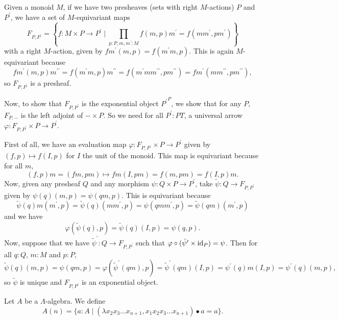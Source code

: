 \begin{definition}
  Given a monoid $ M $, if we have two presheaves (sets with right $ M $-actions) $ P $ and $ P^\prime $, we have a set of $ M $-equivariant maps
  \[ F_{P, P^\prime} = \left\{ f: M \times P \to P^\prime \mid \prod_{p : P, m, m^\prime: M} f(m, p)m^\prime = f(m m^\prime, p m^\prime) \right\} \]
  with a right $ M $-action, given by $ f m^\prime(m, p) = f(m^\prime m, p) $. This is again $ M $-equivariant because
  \[ fm^\prime(m, p)m^{\prime \prime} = f(m^\prime m, p)m^{\prime \prime} = f(m^\prime m m^{\prime \prime}, p m^{\prime \prime}) = f m^\prime(m m^{\prime \prime}, p m^{\prime \prime}), \]
  so $ F_{P, P^\prime} $ is a presheaf.

  Now, to show that $ F_{P, P^\prime} $ is the exponential object $ {P^\prime}^P $, we show that for any $ P $, $ F_{P, -} $ is the left adjoint of $ - \times P $. So we need for all $ P^\prime: PT $, a universal arrow $ \varphi: F_{P, P^\prime} \times P \to P^\prime $.

  First of all, we have an evaluation map $ \varphi: F_{P, P^\prime} \times P \to P^\prime $ given by $ (f, p) \mapsto f(I, p) $ for $ I $ the unit of the monoid. This map is equivariant because for all $ m $,
  \[ (f, p) m = (f m, p m) \mapsto f m(I, p m) = f(m, p m) = f(I, p) m. \]
  Now, given any presheaf $ Q $ and any morphism $ \psi: Q \times P \to P^\prime $, take $ \tilde \psi: Q \to F_{P, P^\prime} $ given by $ \psi(q)(m, p) = \psi(q m, p) $. This is equivariant because
  \[ \tilde \psi(q)m(m^\prime, p) = \tilde \psi(q)(m m^\prime, p) = \psi(q m m^\prime, p) = \tilde \psi(q m)(m^\prime, p) \]
  and we have
  \[ \varphi(\tilde \psi(q), p) = \tilde \psi(q)(I, p) = \psi(q, p). \]
  Now, suppose that we have $ \tilde \psi^\prime: Q \to F_{P, P^\prime} $ such that $ \varphi \circ (\tilde \psi^\prime \times \text{id}_{P}) = \psi $. Then for all $ q : Q $, $ m: M $ and $ p: P $,
  \[ \tilde \psi(q)(m, p) = \psi(q m, p) = \varphi(\tilde \psi^\prime(q m), p) = \tilde \psi^\prime(q m)(I, p) = \psi^\prime(q) m(I, p) = \psi^\prime(q)(m, p), \]
  so $ \tilde \psi $ is unique and $ F_{P, P^\prime} $ is an exponential object.
\end{definition}

\begin{definition}
  Let $ A $ be a $ \Lambda $-algebra. We define
  \[ A(n) = \{ a : A \mid (\lambda x_2 x_3 \dots x_{n + 1}, x_1 x_2 x_3 \dots x_{n + 1}) \bullet a = a \}. \]
\end{definition}

